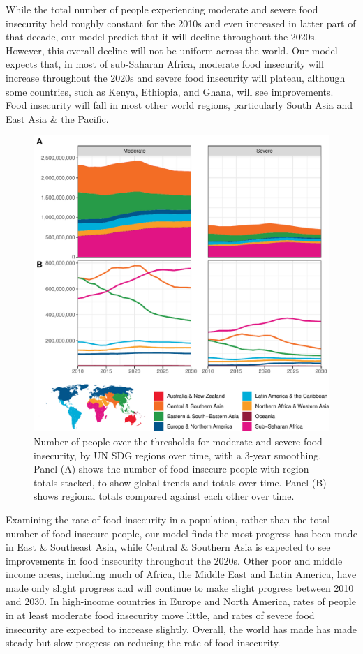 \documentclass{article}
\begin{document}
While the total number of people experiencing moderate and severe food insecurity held roughly constant for the 2010s and even increased in latter part of that decade, our model predict that it will decline throughout the 2020s. However, this overall decline will not be uniform across the world. Our model expects that, in most of sub-Saharan Africa, moderate food insecurity will increase throughout the 2020s and severe food insecurity will plateau, although some countries, such as Kenya, Ethiopia, and Ghana, will see improvements. Food insecurity will fall in most other world regions, particularly South Asia and East Asia \& the Pacific.

\begin{figure}[H]
  \centering
  \includegraphics[width=\linewidth]{img/TimeSeries.pdf}
  \caption{Number of people over the thresholds for moderate and severe food insecurity, by UN SDG regions over time, with a 3-year smoothing.  Panel (A) shows the number of food insecure people with region totals stacked, to show global trends and totals over time.  Panel (B) shows regional totals compared against each other over time.}
  \label{fig:timeseries}
\end{figure}

Examining the rate of food insecurity in a population, rather than the total number of food insecure people, our model finds the most progress has been made in East \& Southeast Asia, while Central \& Southern Asia is expected to see improvements in food insecurity throughout the 2020s.  Other poor and middle income areas, including much of Africa, the Middle East and Latin America, have made only slight progress and will continue to make slight progress between 2010 and 2030.  In high-income countries in Europe and North America, rates of people in at least moderate food insecurity move little, and rates of severe food insecurity are expected to increase slightly.  Overall, the world has made has made steady but slow progress on reducing the rate of food insecurity.
\end{document}
